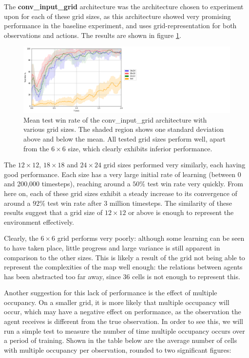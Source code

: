 The \textbf{conv\_input\_grid} architecture was the architecture chosen to experiment upon for each of these grid sizes, as this architecture showed very promising performance in the baseline experiment, and uses grid-representation for both observations and actions. The results are shown in figure \ref{fig:gridsizes}.


\begin{figure}
    \centering
    \hbox{\hspace{5em}\includegraphics[scale=0.5]{images/graphs/grids.png}}
    \caption{Mean test win rate of the conv\_input\_grid architecture with various grid sizes. The shaded region shows one standard deviation above and below the mean. All tested grid sizes perform well, apart from the $6\times6$ size, which clearly exhibits inferior performance.}
    \label{fig:gridsizes}
\end{figure}

The $12\times12$, $18\times18$ and $24\times24$ grid sizes performed very similarly, each having good performance. Each size has a very large initial rate of learning (between 0 and 200,000 timesteps), reaching around a $50\%$ test win rate very quickly. From here on, each of these grid sizes exhibit a steady increase to its convergence of around a $92\%$ test win rate after 3 million timesteps. The similarity of these results suggest that a grid size of $12 \times 12$ or above is enough to represent the environment effectively.




Clearly, the $6 \times 6$ grid performs very poorly: although some learning can be seen to have taken place, little progress and large variance is still apparent in comparison to the other sizes. This is likely a result of the grid not being able to represent the complexities of the map well enough: the relations between agents has been abstracted too far away, since 36 cells is not enough to represent this. 

Another suggestion for this lack of performance is the effect of multiple occupancy. On a smaller grid, it is more likely that multiple occupancy will occur, which may have a negative effect on performance, as the observation the agent receives is different from the true observation. In order to see this, we will run a simple test to measure the number of time multiple occupancy occurs over a period of training. Shown in the table below are the average number of cells with multiple occupancy per observation, rounded to two significant figures:


